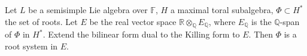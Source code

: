 Let $L$ be a semisimple Lie algebra over $\mathbb{F}$, $H$ a maximal toral subalgebra, $\Phi \subset H^*$ the set of roots. Let $E$ be the real vector space $\mathbb{R} \otimes_{\mathbb{Q}} E_{\mathbb{Q}}$, where $E_{\mathbb{Q}}$ is the $\mathbb{Q}$-span of $\Phi$ in $H^*$. Extend the bilinear form dual to the Killing form to $E$. Then $\Phi$ is a root system in $E$.

